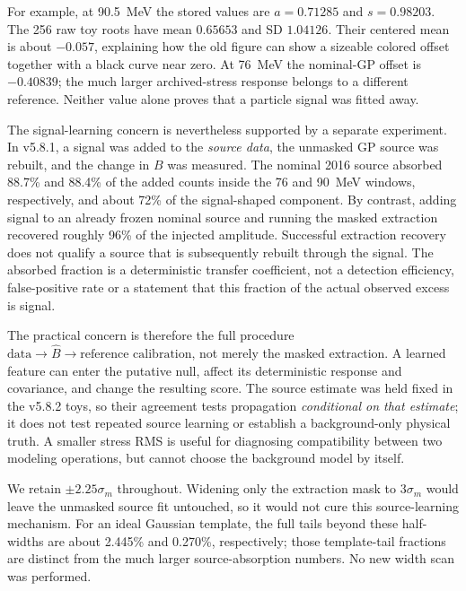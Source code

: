For example, at 90.5~MeV the stored values are $a=0.71285$ and $s=0.98203$. The 256 raw toy roots have mean $0.65653$ and SD $1.04126$. Their centered mean is about $-0.057$, explaining how the old figure can show a sizeable colored offset together with a black curve near zero. At 76~MeV the nominal-GP offset is $-0.40839$; the much larger archived-stress response belongs to a different reference. Neither value alone proves that a particle signal was fitted away.

The signal-learning concern is nevertheless supported by a separate experiment. In v5.8.1, a signal was added to the \emph{source data}, the unmasked GP source was rebuilt, and the change in $B$ was measured. The nominal 2016 source absorbed 88.7\% and 88.4\% of the added counts inside the 76 and 90~MeV windows, respectively, and about 72\% of the signal-shaped component. By contrast, adding signal to an already frozen nominal source and running the masked extraction recovered roughly 96\% of the injected amplitude. Successful extraction recovery does not qualify a source that is subsequently rebuilt through the signal. The absorbed fraction is a deterministic transfer coefficient, not a detection efficiency, false-positive rate or a statement that this fraction of the actual observed excess is signal.

The practical concern is therefore the full procedure $\text{data}\to\widehat B\to\text{reference calibration}$, not merely the masked extraction. A learned feature can enter the putative null, affect its deterministic response and covariance, and change the resulting score. The source estimate was held fixed in the v5.8.2 toys, so their agreement tests propagation \emph{conditional on that estimate}; it does not test repeated source learning or establish a background-only physical truth. A smaller stress RMS is useful for diagnosing compatibility between two modeling operations, but cannot choose the background model by itself.

We retain $\pm2.25\sigma_m$ throughout. Widening only the extraction mask to $3\sigma_m$ would leave the unmasked source fit untouched, so it would not cure this source-learning mechanism. For an ideal Gaussian template, the full tails beyond these half-widths are about 2.445\% and 0.270\%, respectively; those template-tail fractions are distinct from the much larger source-absorption numbers. No new width scan was performed.

